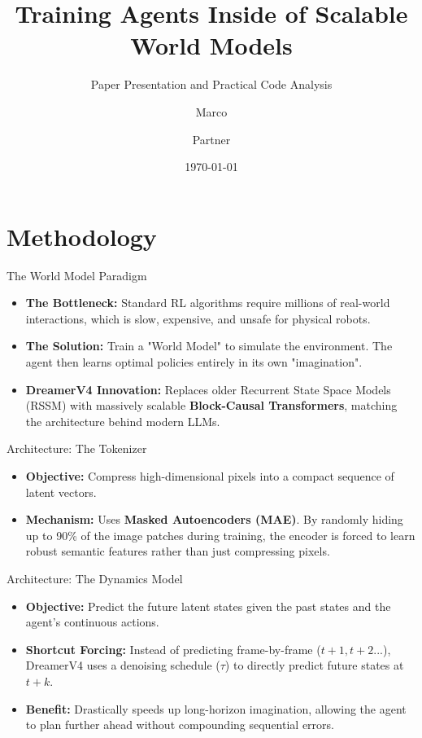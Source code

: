 \documentclass[aspectratio=169]{beamer}
\title[DreamerV4]{Training Agents Inside of Scalable World Models}
\subtitle{Paper Presentation and Practical Code Analysis}
\author{Marco \and Partner}
\institute{Reinforcement Learning Course}
\date{\today}
\begin{document}
\begin{frame}
    \titlepage
\end{frame}

\section{Methodology}

\begin{frame}{The World Model Paradigm}
    \begin{itemize}
        \item \textbf{The Bottleneck:} Standard RL algorithms require millions of real-world interactions, which is slow, expensive, and unsafe for physical robots.
        \item \textbf{The Solution:} Train a "World Model" to simulate the environment. The agent then learns optimal policies entirely in its own "imagination".
        \item \textbf{DreamerV4 Innovation:} Replaces older Recurrent State Space Models (RSSM) with massively scalable \textbf{Block-Causal Transformers}, matching the architecture behind modern LLMs.
    \end{itemize}
\end{frame}

\begin{frame}{Architecture: The Tokenizer}
    \begin{itemize}
        \item \textbf{Objective:} Compress high-dimensional pixels into a compact sequence of latent vectors.
        \item \textbf{Mechanism:} Uses \textbf{Masked Autoencoders (MAE)}. By randomly hiding up to 90\% of the image patches during training, the encoder is forced to learn robust semantic features rather than just compressing pixels.
    \end{itemize}
\end{frame}

\begin{frame}{Architecture: The Dynamics Model}
    \begin{itemize}
        \item \textbf{Objective:} Predict the future latent states given the past states and the agent's continuous actions.
        \item \textbf{Shortcut Forcing:} Instead of predicting frame-by-frame ($t+1, t+2...$), DreamerV4 uses a denoising schedule ($\tau$) to directly predict future states at $t+k$.
        \item \textbf{Benefit:} Drastically speeds up long-horizon imagination, allowing the agent to plan further ahead without compounding sequential errors.
    \end{itemize}
\end{frame}
\end{document}
